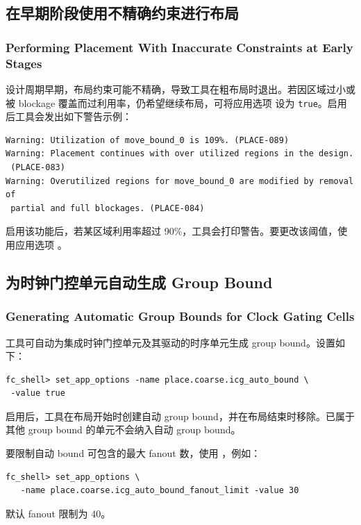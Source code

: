 \subsection{在早期阶段使用不精确约束进行布局}
\subsubsection*{Performing Placement With Inaccurate Constraints at Early Stages}

设计周期早期，布局约束可能不精确，导致工具在粗布局时退出。若因区域过小或被 blockage 覆盖而过利用率，仍希望继续布局，可将应用选项  设为 \texttt{true}。启用后工具会发出如下警告示例：
\begin{lstlisting}
Warning: Utilization of move_bound_0 is 109%. (PLACE-089)
Warning: Placement continues with over utilized regions in the design.
 (PLACE-083)
Warning: Overutilized regions for move_bound_0 are modified by removal of
 partial and full blockages. (PLACE-084)
\end{lstlisting}

启用该功能后，若某区域利用率超过 90\%，工具会打印警告。要更改该阈值，使用应用选项 。

\subsection{为时钟门控单元自动生成 Group Bound}
\subsubsection*{Generating Automatic Group Bounds for Clock Gating Cells}

工具可自动为集成时钟门控单元及其驱动的时序单元生成 group bound。设置如下：
\begin{lstlisting}
fc_shell> set_app_options -name place.coarse.icg_auto_bound \
 -value true
\end{lstlisting}

启用后，工具在布局开始时创建自动 group bound，并在布局结束时移除。已属于其他 group bound 的单元不会纳入自动 group bound。

要限制自动 bound 可包含的最大 fanout 数，使用 ，例如：
\begin{lstlisting}
fc_shell> set_app_options \
   -name place.coarse.icg_auto_bound_fanout_limit -value 30
\end{lstlisting}
默认 fanout 限制为 40。

